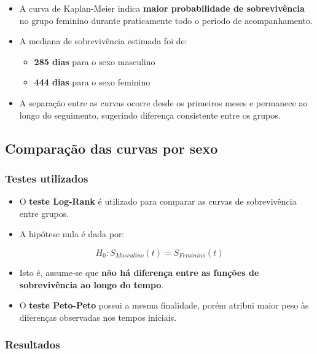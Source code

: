 \documentclass[
  brazilian,
  letterpaper,
  DIV=11,
  numbers=noendperiod]{scrartcl}
\providecommand{\tightlist}{%
  \setlength{\itemsep}{0pt}\setlength{\parskip}{0pt}}
\begin{document}
\begin{itemize}
\item
  A curva de Kaplan-Meier indica \textbf{maior probabilidade de
  sobrevivência} no grupo feminino durante praticamente todo o período
  de acompanhamento.
\item
  A mediana de sobrevivência estimada foi de:

  \begin{itemize}
  \tightlist
  \item
    \textbf{285 dias} para o sexo masculino
  \item
    \textbf{444 dias} para o sexo feminino
  \end{itemize}
\item
  A separação entre as curvas ocorre desde os primeiros meses e
  permanece ao longo do seguimento, sugerindo diferença consistente
  entre os grupos.
\end{itemize}

\subsection{\texorpdfstring{\textbf{Comparação das curvas por
sexo}}{Comparação das curvas por sexo}}\label{comparauxe7uxe3o-das-curvas-por-sexo}

\subsubsection{\texorpdfstring{\textbf{Testes
utilizados}}{Testes utilizados}}\label{testes-utilizados}

\begin{itemize}
\item
  O \textbf{teste Log-Rank} é utilizado para comparar as curvas de
  sobrevivência entre grupos.
\item
  A hipótese nula é dada por:
\end{itemize}

\[
H_0: S_{Masculino}(t)=S_{Feminino}(t)
\]

\begin{itemize}
\item
  Isto é, assume-se que \textbf{não há diferença entre as funções de
  sobrevivência ao longo do tempo}.
\item
  O \textbf{teste Peto-Peto} possui a mesma finalidade, porém atribui
  maior peso às diferenças observadas nos tempos iniciais.
\end{itemize}

\subsubsection{\texorpdfstring{\textbf{Resultados}}{Resultados}}\label{resultados-1}
\end{document}
